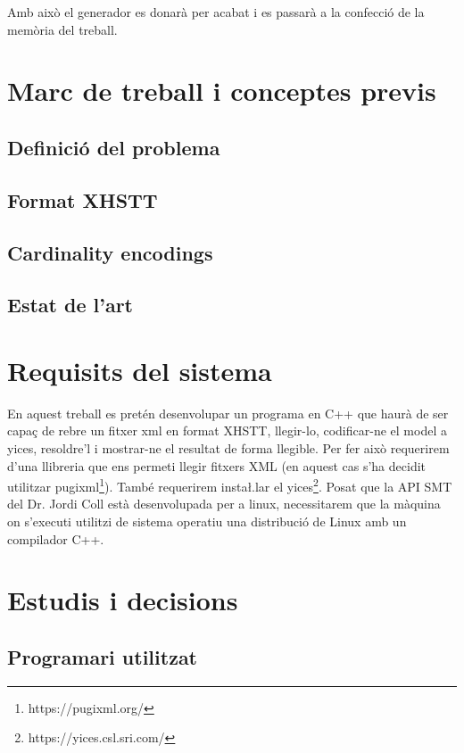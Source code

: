 \documentclass[11pt,a4paper,twoside]{report}
\begin{document}
  Amb això el generador es donarà per acabat i es passarà a la confecció de la memòria del treball. 





  \chapter{Marc de treball i conceptes previs}
  \section{Definició del problema}
  \section{Format XHSTT}
  \section{Cardinality encodings}
  \section{Estat de l'art}
  





  \chapter{Requisits del sistema}

  En aquest treball es pretén desenvolupar un programa en C++ que haurà de ser capaç de rebre un fitxer xml en format XHSTT, llegir-lo, codificar-ne el model a yices, resoldre'l i mostrar-ne el resultat de forma llegible. 
  Per fer això requerirem d'una llibreria que ens permeti llegir fitxers XML (en aquest cas s'ha decidit utilitzar pugixml\footnote{https://pugixml.org/}). També requerirem insta\l.lar el yices\footnote{https://yices.csl.sri.com/}. 
  Posat que la API SMT del Dr. Jordi Coll està desenvolupada per a linux, necessitarem que la màquina on s'executi utilitzi de sistema operatiu una distribució de Linux amb un compilador C++. 
 

  \chapter{Estudis i decisions}
  \section{Programari utilitzat}
\end{document}

